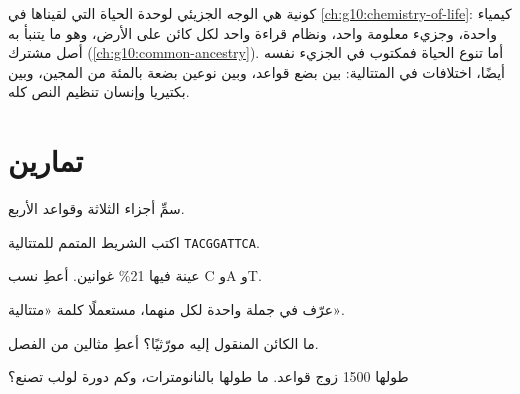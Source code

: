\begin{remark}\label{rem:g10:universal-dna:unity}
كونية  هي الوجه الجزيئي لوحدة الحياة التي لقيناها في
\cref{ch:g10:chemistry-of-life}: كيمياء واحدة، وجزيء معلومة واحد،
ونظام قراءة واحد لكل كائن على الأرض، وهو ما يتنبأ به أصل مشترك
(\cref{ch:g10:common-ancestry}). أما تنوع الحياة فمكتوب في الجزيء
نفسه أيضًا، اختلافات في المتتالية: بين  بضع قواعد، وبين نوعين
بضعة بالمئة من المجين، وبين بكتيريا وإنسان تنظيم النص كله.
\end{remark}

\section{تمارين}

\begin{exercise}[$\star$]\label{exo:g10:universal-dna:1}
سمِّ أجزاء  الثلاثة وقواعد  الأربع.
\end{exercise}

\begin{exercise}[$\star$]\label{exo:g10:universal-dna:2}
اكتب الشريط المتمم للمتتالية \texttt{TACGGATTCA}.
\end{exercise}

\begin{exercise}[$\star$]\label{exo:g10:universal-dna:3}
عينة  فيها 21\% غوانين. أعطِ نسب C وA وT.
\end{exercise}

\begin{exercise}[$\star$]\label{exo:g10:universal-dna:4}
عرّف   في جملة واحدة لكل منهما، مستعملًا كلمة
«متتالية».
\end{exercise}

\begin{exercise}[$\star$]\label{exo:g10:universal-dna:5}
ما الكائن المنقول إليه مورّثيًا؟ أعطِ مثالين من الفصل.
\end{exercise}

\begin{exercise}[$\star\star$]\label{exo:g10:universal-dna:6}
 طولها 1500 زوج قواعد. ما طولها بالنانومترات، وكم دورة لولب
تصنع؟
\end{exercise}

